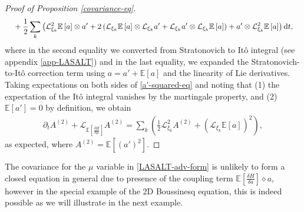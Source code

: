 \documentclass[11pt, oneside]{article}   	%
\numberwithin{equation}{section}
\theoremstyle{plain}
\theoremstyle{definition}
\theoremstyle{remark}
\newcommand{\<}{\langle}
\renewcommand{\>}{\rangle}
\def\diff{\textnormal{d}}
\newcommand{\E}[1]{\mathbb{E}\left[{#1}\right]}
\begin{document}
\begin{proof}[Proof of Proposition \ref{covariance-eq}]
\begin{align}
    &\quad  +\frac12 \displaystyle\sum_k \left(\mathcal L_{\xi_k}^2 \E{a} \otimes a' + 2\left(\mathcal L_{\xi_k} \E{a} \otimes \mathcal L_{\xi_k} a' + \mathcal L_{\xi_k} a'  \otimes \mathcal L_{\xi_k} \E{a} \right) + a' \otimes \mathcal L_{\xi_k}^2 \E{a}\right) \diff t,
\label{a'-squared-eq}
\end{align}
where in the second equality we converted from Stratonovich to It\^o integral (see appendix \ref{app-LASALT}) and in the last equality, we expanded the Stratonovich-to-It\^o correction term using $a = a' + \E{a}$ and the linearity of Lie derivatives. Taking expectations on both sides of \eqref{a'-squared-eq} and noting that (1) the expectation of the It\^o integral vanishes by the martingale property, and (2) $\E{a'} = 0$ by definition, we obtain
\begin{align*}
    \partial_{t} A^{(2)} + \mathcal L_{\E{\frac{\delta H}{\delta \mu}}}A^{(2)} = \displaystyle\sum_k \left(\frac12 \mathcal L_{\xi_k}^2 A^{(2)} + \left(\mathcal L_{\xi_k} \E{a}\right)^2 \right),
\end{align*}
as expected, where $A^{(2)} = \E{(a')^2}$.
\end{proof}

The covariance for the $\mu$ variable in \eqref{LASALT-adv-form} is unlikely to form a closed equation in general due to presence of the coupling term $\E{\frac{\delta H}{\delta a}} \diamond a$, however in the special example of the 2D Boussinesq equation, this is indeed possible as we will illustrate in the next example.
\end{document}
